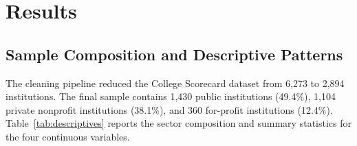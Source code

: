 \section{Results}

\subsection{Sample Composition and Descriptive Patterns}

The cleaning pipeline reduced the College Scorecard dataset from 6,273 to 2,894 institutions. The final sample contains 1,430 public institutions (49.4\%), 1,104 private nonprofit institutions (38.1\%), and 360 for-profit institutions (12.4\%). Table~\ref{tab:descriptives} reports the sector composition and summary statistics for the four continuous variables.

